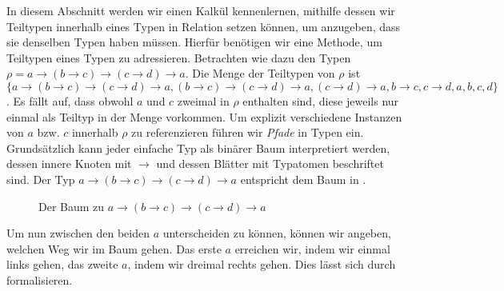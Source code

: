 In diesem Abschnitt werden wir einen Kalkül kennenlernen, mithilfe dessen wir Teiltypen innerhalb eines Typen in Relation setzen können, um anzugeben, dass sie denselben Typen haben müssen.
Hierfür benötigen wir eine Methode, um Teiltypen eines Typen zu adressieren. Betrachten wie dazu den Typen $\rho = a \to (b\to c)\to(c\to d) \to a$. Die Menge der Teiltypen von $\rho$ ist $\{a\to (b\to c) \to (c\to d)\to a, (b\to c) \to (c\to d)\to a, (c\to d)\to a, b\to c, c\to d, a, b, c, d\}$
. Es fällt auf, dass obwohl $a$ und $c$ zweimal in $\rho$ enthalten sind, diese jeweils nur einmal als Teiltyp in der Menge vorkommen. Um explizit verschiedene Instanzen von $a$ bzw. $c$ innerhalb $\rho$ zu referenzieren führen wir \emph{Pfade} in Typen ein. Grundsätzlich kann jeder einfache Typ als binärer Baum interpretiert werden, dessen innere Knoten mit $\to$ und dessen Blätter mit Typatomen beschriftet sind. Der Typ $a\to (b\to c)\to(c\to d)\to a$ entspricht dem Baum in .
\begin{figure}
    \begin{center}
\end{center}
    \caption{Der Baum zu $a\to (b\to c) \to (c\to d)\to a$}
    \label{fig:Ktree}
\end{figure}

Um nun zwischen den beiden $a$ unterscheiden zu können, können wir angeben, welchen Weg wir im Baum gehen. Das erste $a$ erreichen wir, indem wir einmal links gehen, das zweite $a$, indem wir dreimal rechts gehen. Dies lässt sich durch  formalisieren.

